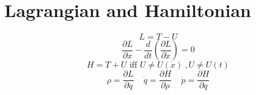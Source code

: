 \documentclass[10pt,a4paper]{article}
\begin{document}
\section{Lagrangian and Hamiltonian} %
\label{sec:lagrangian_and_hamiltonian}
\begin{equation}
    L = T - U
\end{equation}
\begin{equation}
    \frac{\partial L}{\partial x} - \frac{d}{dt} \left( \frac{\partial L}{\partial \dot{x}} \right) = 0
\end{equation}
\begin{equation}
    H = T + U \textrm{ iff }U \neq U(\dot{x})~, U \neq U(t)
\end{equation}
\begin{equation}
    \rho = \frac{\partial L}{\partial \dot{q}}~~~~~\dot{q} = \frac{\partial H}{\partial \rho}~~~~~ \dot{p} = \frac{\partial H}{\partial q}
\end{equation}
\end{document}

